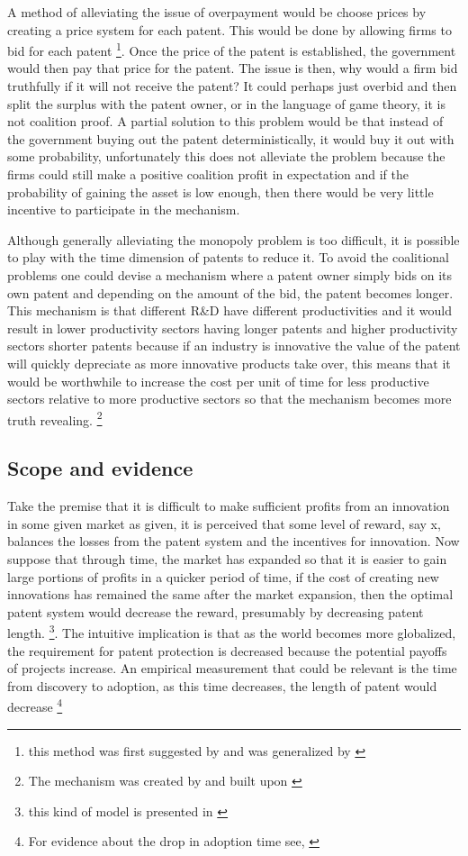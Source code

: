 \documentclass[12pt]{article}
\numberwithin{equation}{section}
\begin{document}
A method of alleviating the issue of overpayment would be choose prices by creating a price system for each patent. This would be done by allowing firms to bid for each patent \footnote{this method was first suggested by\cite{kremer_1998} and was generalized by \cite{weyl2012market}}. Once the price of the patent is established, the government would then pay that price for the patent. The issue is then, why would a firm bid truthfully if it will not receive the patent? It could perhaps just overbid and then split the surplus with the patent owner, or in the language of game theory, it is not coalition proof. A partial solution to this problem would be that instead of the government buying out the patent deterministically, it would buy it out with some probability, unfortunately this does not alleviate the problem because the firms could still make a positive coalition profit in expectation and if the probability of gaining the asset is low enough, then there would be very little incentive to participate in the mechanism.

Although generally alleviating the monopoly problem is too difficult, it is possible to play with the time dimension of patents to reduce it. To avoid the coalitional problems one could devise a mechanism where a patent owner simply bids on its own patent and depending on the amount of the bid, the patent becomes longer. This mechanism is that different R\&D have different productivities and it would result in lower productivity sectors having longer patents and higher productivity sectors shorter patents because if an industry is innovative the value of the patent will quickly depreciate as more innovative products take over, this means that it would be worthwhile to increase the cost per unit of time for less productive sectors relative to more productive sectors so that the mechanism becomes more truth revealing.  \footnote{ The mechanism was created by \cite{Scotchmer1999} and built upon \cite{Cornelli1999}}


\subsection{Scope and evidence}

Take the premise that it is difficult to make sufficient profits from an innovation in some given market as given, it is perceived that some level of reward, say x, balances the losses from the patent system and the incentives for innovation. Now suppose that through time, the market has expanded so that it is easier to gain large portions of profits in a quicker period of time, if the cost of creating new innovations has remained the same after the market expansion, then the optimal patent system would decrease the reward, presumably by decreasing patent length. \footnote{this kind of model is presented in \cite{boldrin2009market} }. The intuitive implication is that as the world becomes more globalized, the requirement for patent protection is decreased because the potential payoffs of projects increase. An empirical measurement that could be relevant is the time from discovery to adoption, as this time decreases, the length of patent would decrease \footnote{For evidence about the drop in adoption time see, \cite{comin2006five}}
\end{document}
